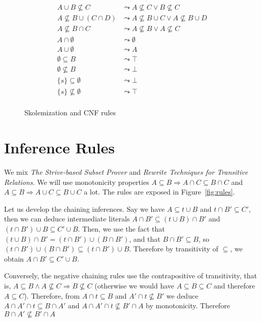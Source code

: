 \documentclass{article}
\begin{document}
\begin{figure}[htbp]
\begin{center}
\begin{align*}
A \cup B \not\subseteq C
    & \leadsto A \not\subseteq C \lor B \not\subseteq C \\
A \not\subseteq B \cup (C \cap D)
    & \leadsto A \not\subseteq B \cup C \lor A \not\subseteq B \cup D \\
A \not\subseteq B \cap C
    & \leadsto A \not\subseteq B \lor A \not\subseteq C \\
A \cap \emptyset
    & \leadsto \emptyset \\
A \cup \emptyset
    & \leadsto A \\
\emptyset \subseteq B
    & \leadsto \top \\
\emptyset \not\subseteq B
    & \leadsto \bot \\
\{ s \} \subseteq \emptyset
    & \leadsto \bot \\
\{ s \} \not\subseteq \emptyset
    & \leadsto \top \\
\end{align*}
\caption{Skolemization and CNF rules}
\label{fig:skolem}
\end{center}
\end{figure}



\section{Inference Rules}
We mix \emph{The Strive-based Subset Prover} and
\emph{Rewrite Techniques for Transitive Relations}.
We will use monotonicity properties $A \subseteq B \Rightarrow A \cap C
\subseteq B \cap C$ and $A \subseteq B \Rightarrow A \cup C \subseteq B \cup C$
a lot. The rules are exposed in Figure~\ref{fig:rules}.

Let us develop the chaining inferences. Say we have $A \subseteq t\cup B$
and $t \cap B' \subseteq C'$, then we can deduce intermediate literals
$A \cap B' \subseteq (t \cup B) \cap B'$ and
$(t\cap B')\cup B \subseteq C' \cup B$. Then, we use the fact that
$(t \cup B) \cap B' = (t\cap B') \cup (B\cap B')$, and that
$B \cap B' \subseteq B$, so $(t\cap B') \cup (B\cap B') \subseteq (t \cap B')\cup B$.
Therefore by transitivity of $\subseteq$, we obtain
$A\cap B' \subseteq C' \cup B$.

Conversely, the negative chaining rules use the contrapositive of transitivity,
that is, $A \subseteq B \land A \not\subseteq C \Rightarrow B \not\subseteq C$
(otherwise we would have $A \subseteq B \subseteq C$ and therefore $A \subseteq C$).
Therefore, from $A \cap t \subseteq B$ and $A' \cap t \not\subseteq B'$ we
deduce $A\cap A'\cap t \subseteq B\cap A'$
and $A\cap A'\cap t \not\subseteq B'\cap A$ by monotonicity. Therefore
$B\cap A' \not\subseteq B'\cap A$
\end{document}

